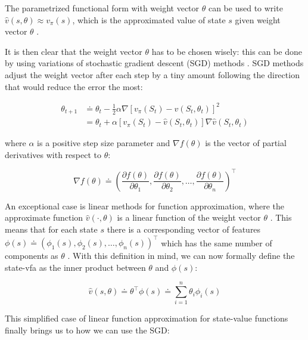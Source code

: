 \documentclass{seal_thesis}
\begin{document}
The parametrized functional form with weight vector $\theta$ can be used to write $\hat{v}(s,\theta) \approx v_\pi (s)$, which is the approximated value of state $s$ given weight vector $\theta$ \cite[p. 191]{Sutton2017}.

It is then clear that the weight vector $\theta$ has to be chosen wisely: this can be done by using variations of stochastic gradient descent (SGD) methods \cite[p. 223]{Sutton2017}. SGD methods adjust the weight vector after each step by a tiny amount following the direction that would reduce the error the most:

\begin{align}
	\theta_{t+1} &\doteq \theta_t - \frac{1}{2} \alpha \nabla [v_\pi (S_t) - \hat{v} (S_t,\theta_t)]^2\\
	&= \theta_t + \alpha  [v_\pi (S_t) - \hat{v} (S_t,\theta_t)] \nabla \hat{v} (S_t,\theta_t)
\end{align}

where $\alpha$ is a positive step size parameter and $\nabla f(\theta)$ is the vector of partial derivatives with respect to $\theta$:

\begin{equation}
	\nabla f(\theta) \doteq \left( \frac{\partial f(\theta)}{\partial \theta_1}, \frac{\partial f(\theta)}{\partial \theta_2}, \ldots, \frac{\partial f(\theta)}{\partial \theta_n} \right)^\top
\end{equation}


An exceptional case is linear methods for function approximation, where the approximate function $\hat{v} (\cdot ,\theta)$ is a linear function of the weight vector $\theta$ \cite[p. 198]{Sutton2017}. This means that for each state $s$ there is a corresponding vector of features $\phi (s) \doteq \left( \phi_1 (s), \phi_2 (s), \ldots, \phi_n (s) \right)^\top$ which has the same number of components as $\theta$ \cite[p. 198]{Sutton2017}. With this definition in mind, we can now formally define the state-\gls{vfa} as the inner product between $\theta$ and $\phi (s)$:

\begin{equation}
\label{eq:function_approximation_dot}
	\hat{v} (s,\theta) \doteq \theta^\top \phi (s) \doteq \sum_{i=1}^n \theta_i \phi_i (s)
\end{equation}

This simplified case of linear function approximation for state-value functions finally brings us to how we can use the SGD:
\end{document}

